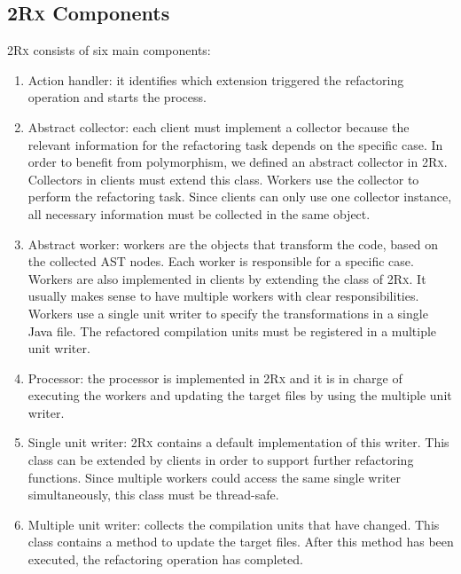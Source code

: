 \documentclass[type=bsc,accentcolor=tud9c]{tudthesis}
\newcommand{\framework}[1]{\textcolor{black}{#1}}
\newcommand{\toolcore}{\textsc{2Rx}}
\begin{document}
\subsection{\toolcore{} Components}
\label{sec:core-components}
\toolcore{} consists of six main components:
\begin{enumerate}
	\item Action handler: it identifies which extension triggered the refactoring operation and starts the process.
	\item Abstract collector: each client must implement a collector because the relevant information for the refactoring task depends on the specific case. In order to benefit from polymorphism, we defined an abstract collector in \toolcore{}. Collectors in clients must extend this class. Workers use the collector to perform the refactoring task. Since clients can only use one collector instance, all necessary information must be collected in the same object.
	\item Abstract worker: workers are the objects that transform the code, based on the collected AST nodes. Each worker is responsible for a specific case. Workers are also implemented in clients by extending the class  of \toolcore{}. It usually makes sense to have multiple workers with clear responsibilities. Workers use a single unit writer to specify the transformations in a single \framework{Java} file. The refactored compilation units must be registered in a multiple unit writer.
	\item Processor: the processor is implemented in \toolcore{} and it is in charge of executing the workers and updating the target files by using the multiple unit writer.
	\item Single unit writer: \toolcore{} contains a default implementation of this writer. This class can be extended by clients in order to support further refactoring functions. Since multiple workers could access the same single writer simultaneously, this class must be thread-safe.
	\item Multiple unit writer: collects the compilation units that have changed. This class contains a method to update the target files. After this method has been executed, the refactoring operation has completed.
\end{enumerate}
\end{document}
